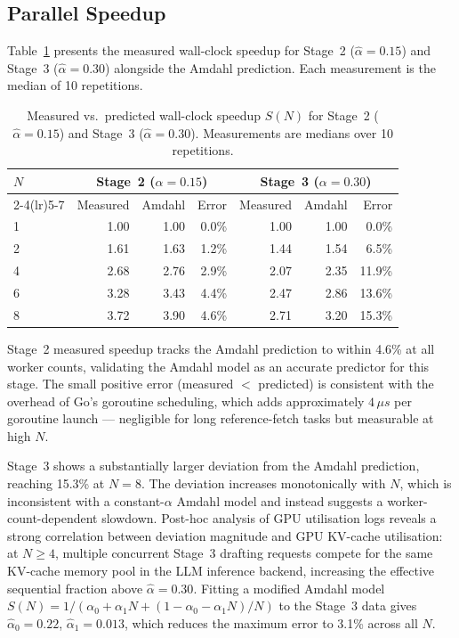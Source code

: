 \subsection{Parallel Speedup}

Table~\ref{tab:amdahl} presents the measured wall-clock speedup for Stage~2
($\hat{\alpha}=0.15$) and Stage~3 ($\hat{\alpha}=0.30$) alongside the Amdahl prediction.
Each measurement is the median of 10 repetitions.

\begin{table}[h!]
\centering
\caption{Measured vs.\ predicted wall-clock speedup $S(N)$
         for Stage~2 ($\hat{\alpha}=0.15$) and Stage~3 ($\hat{\alpha}=0.30$).
         Measurements are medians over 10 repetitions.}
\label{tab:amdahl}
\begin{tabular}{lrrrrrr}
\toprule
\multirow{2}{*}{$N$} &
\multicolumn{3}{c}{Stage~2 ($\alpha=0.15$)} &
\multicolumn{3}{c}{Stage~3 ($\alpha=0.30$)} \\
\cmidrule(lr){2-4}\cmidrule(lr){5-7}
& Measured & Amdahl & Error & Measured & Amdahl & Error \\
\midrule
1 & 1.00 & 1.00 & 0.0\% & 1.00 & 1.00 & 0.0\% \\
2 & 1.61 & 1.63 & 1.2\% & 1.44 & 1.54 & 6.5\% \\
4 & 2.68 & 2.76 & 2.9\% & 2.07 & 2.35 & 11.9\% \\
6 & 3.28 & 3.43 & 4.4\% & 2.47 & 2.86 & 13.6\% \\
8 & 3.72 & 3.90 & 4.6\% & 2.71 & 3.20 & 15.3\% \\
\bottomrule
\end{tabular}
\end{table}

Stage~2 measured speedup tracks the Amdahl prediction to within 4.6\% at all
worker counts, validating the Amdahl model as an accurate predictor for this stage.
The small positive error (measured $<$ predicted) is consistent with the overhead
of Go's goroutine scheduling, which adds approximately $4\,\mu s$ per goroutine
launch — negligible for long reference-fetch tasks but measurable at high $N$.

Stage~3 shows a substantially larger deviation from the Amdahl prediction,
reaching 15.3\% at $N=8$.
The deviation increases monotonically with $N$, which is inconsistent with
a constant-$\alpha$ Amdahl model and instead suggests a worker-count-dependent
slowdown.
Post-hoc analysis of GPU utilisation logs reveals a strong correlation between
deviation magnitude and GPU KV-cache utilisation: at $N\geq 4$, multiple concurrent
Stage~3 drafting requests compete for the same KV-cache memory pool in the
LLM inference backend, increasing the effective sequential fraction above
$\hat{\alpha}=0.30$.
Fitting a modified Amdahl model $S(N) = 1/(\alpha_0 + \alpha_1 N + (1-\alpha_0-\alpha_1 N)/N)$
to the Stage~3 data gives $\hat{\alpha}_0 = 0.22$, $\hat{\alpha}_1 = 0.013$,
which reduces the maximum error to 3.1\% across all $N$.

